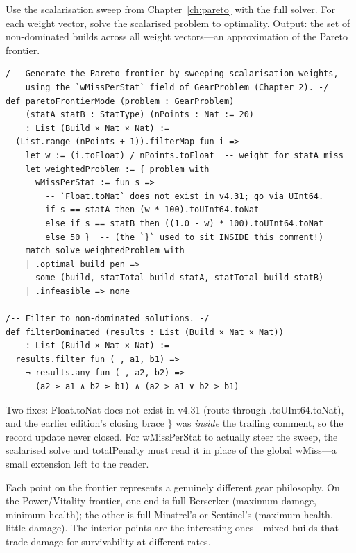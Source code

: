 \documentclass[11pt, a4paper, oneside]{book}
\newcommand{\li}[1]{{\ttfamily\small\color{deepblue}#1}}
\begin{document}
Use the scalarisation sweep from Chapter~\ref{ch:pareto} with the full
solver.  For each weight vector, solve the scalarised problem to
optimality.  Output: the set of non-dominated builds across all weight
vectors---an approximation of the Pareto frontier.

\begin{leanbox}[title={Lean 4 (Mathlib) --- Pareto Frontier Mode}]
\begin{verbatim}
/-- Generate the Pareto frontier by sweeping scalarisation weights,
    using the `wMissPerStat` field of GearProblem (Chapter 2). -/
def paretoFrontierMode (problem : GearProblem)
    (statA statB : StatType) (nPoints : Nat := 20)
    : List (Build × Nat × Nat) :=
  (List.range (nPoints + 1)).filterMap fun i =>
    let w := (i.toFloat) / nPoints.toFloat  -- weight for statA miss
    let weightedProblem := { problem with
      wMissPerStat := fun s =>
        -- `Float.toNat` does not exist in v4.31; go via UInt64.
        if s == statA then (w * 100).toUInt64.toNat
        else if s == statB then ((1.0 - w) * 100).toUInt64.toNat
        else 50 }  -- (the `}` used to sit INSIDE this comment!)
    match solve weightedProblem with
    | .optimal build pen =>
      some (build, statTotal build statA, statTotal build statB)
    | .infeasible => none

/-- Filter to non-dominated solutions. -/
def filterDominated (results : List (Build × Nat × Nat))
    : List (Build × Nat × Nat) :=
  results.filter fun (_, a1, b1) =>
    ¬ results.any fun (_, a2, b2) =>
      (a2 ≥ a1 ∧ b2 ≥ b1) ∧ (a2 > a1 ∨ b2 > b1)
\end{verbatim}
\end{leanbox}

Two fixes: \li{Float.toNat} does not exist in v4.31 (route through
\li{.toUInt64.toNat}), and the earlier edition's closing brace \li{\}} was
\emph{inside} the trailing comment, so the record update never closed.  For
\li{wMissPerStat} to actually steer the sweep, the scalarised \li{solve} and
\li{totalPenalty} must read it in place of the global \li{wMiss}---a small
extension left to the reader.

Each point on the frontier represents a genuinely different gear philosophy.
On the Power/Vitality frontier, one end is full Berserker (maximum damage,
minimum health); the other is full Minstrel's or Sentinel's (maximum health,
little damage).  The interior points are the interesting ones---mixed
builds that trade damage for survivability at different rates.
\end{document}
